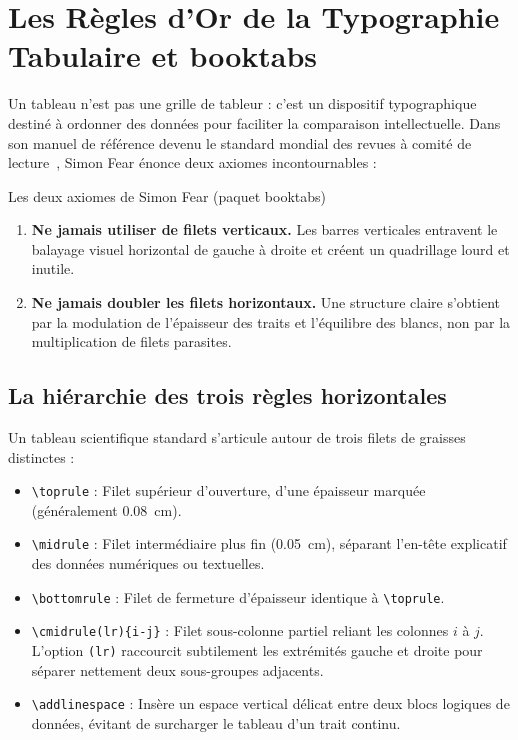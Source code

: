 \section{Les Règles d'Or de la Typographie Tabulaire et \textsf{booktabs}}
\label{sec:regles_booktabs}

Un tableau n'est pas une grille de tableur : c'est un dispositif typographique destiné à ordonner des données pour faciliter la comparaison intellectuelle.
Dans son manuel de référence devenu le standard mondial des revues à comité de lecture~\cite{fear2020booktabs}, Simon Fear énonce deux axiomes incontournables :

\begin{boiteSynthese}{Les deux axiomes de Simon Fear (paquet \textsf{booktabs})}
  \begin{enumerate}
    \item \textbf{Ne jamais utiliser de filets verticaux.} Les barres verticales entravent le balayage visuel horizontal de gauche à droite et créent un quadrillage lourd et inutile.
    \item \textbf{Ne jamais doubler les filets horizontaux.} Une structure claire s'obtient par la modulation de l'épaisseur des traits et l'équilibre des blancs, non par la multiplication de filets parasites.
  \end{enumerate}
\end{boiteSynthese}

\subsection{La hiérarchie des trois règles horizontales}
\label{subsec:trois_regles_horizontales}

Un tableau scientifique standard s'articule autour de trois filets de graisses distinctes :
\begin{itemize}
  \item \texttt{\textbackslash toprule} : Filet supérieur d'ouverture, d'une épaisseur marquée (généralement \qty{0.08}{\centi\meter}).
  \item \texttt{\textbackslash midrule} : Filet intermédiaire plus fin (\qty{0.05}{\centi\meter}), séparant l'en-tête explicatif des données numériques ou textuelles.
  \item \texttt{\textbackslash bottomrule} : Filet de fermeture d'épaisseur identique à \texttt{\textbackslash toprule}.
  \item \texttt{\textbackslash cmidrule(lr)\{i-j\}} : Filet sous-colonne partiel reliant les colonnes $i$ à $j$. L'option \texttt{(lr)} raccourcit subtilement les extrémités gauche et droite pour séparer nettement deux sous-groupes adjacents.
  \item \texttt{\textbackslash addlinespace} : Insère un espace vertical délicat entre deux blocs logiques de données, évitant de surcharger le tableau d'un trait continu.
\end{itemize}

